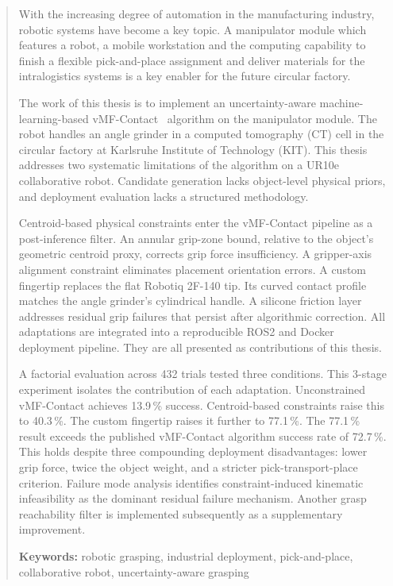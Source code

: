 \documentclass[oneside,studentpaper]{wbk}
\begin{document}
\begin{abstract}
With the increasing degree of automation in the manufacturing industry, robotic systems have become a key topic. A manipulator module which features a robot, a mobile workstation and the computing capability to finish a flexible pick-and-place assignment and deliver materials for the intralogistics systems is a key enabler for the future circular factory.

The work of this thesis is to implement an uncertainty-aware machine-learning-based vMF-Contact~\cite{shi2025} algorithm on the manipulator module. The robot handles an angle grinder in a computed tomography (CT) cell in the circular factory at Karlsruhe Institute of Technology (KIT). This thesis addresses two systematic limitations of the algorithm on a UR10e collaborative robot. Candidate generation lacks object-level physical priors, and deployment evaluation lacks a structured methodology.

Centroid-based physical constraints enter the vMF-Contact pipeline as a post-inference filter. An annular grip-zone bound, relative to the object's geometric centroid proxy, corrects grip force insufficiency. A gripper-axis alignment constraint eliminates placement orientation errors. A custom fingertip replaces the flat Robotiq 2F-140 tip. Its curved contact profile matches the angle grinder's cylindrical handle. A silicone friction layer addresses residual grip failures that persist after algorithmic correction. All adaptations are integrated into a reproducible ROS2 and Docker deployment pipeline. They are all presented as contributions of this thesis.

A factorial evaluation across 432 trials tested three conditions. This 3-stage experiment isolates the contribution of each adaptation. Unconstrained vMF-Contact achieves 13.9\,\% success. Centroid-based constraints raise this to 40.3\,\%. The custom fingertip raises it further to 77.1\,\%. The 77.1\,\% result exceeds the published vMF-Contact algorithm success rate of 72.7\,\%. This holds despite three compounding deployment disadvantages: lower grip force, twice the object weight, and a stricter pick-transport-place criterion. Failure mode analysis identifies constraint-induced kinematic infeasibility as the dominant residual failure mechanism. Another grasp reachability filter is implemented subsequently as a supplementary improvement.

\textbf{Keywords:} robotic grasping, industrial deployment, pick-and-place, collaborative robot, uncertainty-aware grasping
\end{abstract}
\end{document}
